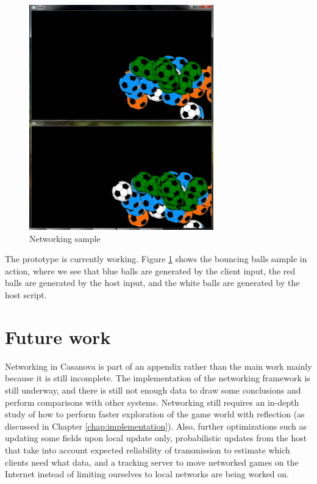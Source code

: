\begin{figure}
\begin{center}
\includegraphics[width=8cm]{Pics/Networked_balls.png}
\end{center}
\caption{Networking sample}
\label{fig:networking_sample}
\end{figure}

The prototype is currently working. Figure \ref{fig:networking_sample} shows the bouncing balls sample in action, where we see that blue balls are generated by the client input, the red balls are generated by the host input, and the white balls are generated by the host script. %



\section{Future work}
Networking in Casanova is part of an appendix rather than the main work mainly because it is still incomplete. The implementation of the networking framework is still underway, and there is still not enough data to draw some conclusions and perform comparisons with other systems. Networking still requires an in-depth study of how to perform faster exploration of the game world with reflection (as discussed in Chapter \ref{chap:implementation}). Also, further optimizations such as updating some fields upon local update only, probabilistic updates from the host that take into account expected reliability of transmission to estimate which clients need what data, and a tracking server to move networked games on the Internet instead of limiting ourselves to local networks are being worked on.
